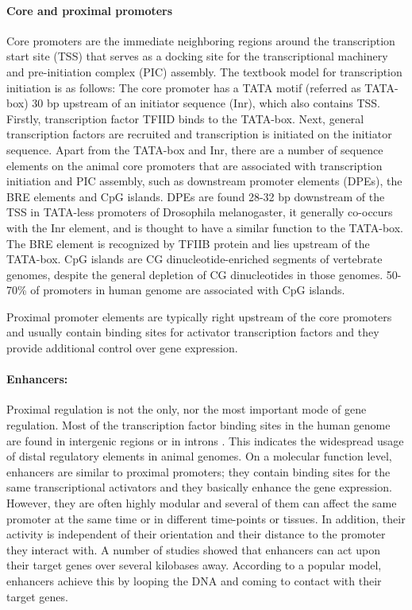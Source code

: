 \documentclass[12pt,]{krantz}
\let\oldparagraph\paragraph
\renewcommand{\paragraph}[1]{\oldparagraph{#1}\mbox{}}
\begin{document}
\hypertarget{core-and-proximal-promoters}{%
\paragraph{Core and proximal promoters}\label{core-and-proximal-promoters}}

Core promoters are the immediate neighboring regions around
the transcription start site (TSS) that serves as a docking site for the
transcriptional machinery and pre-initiation complex (PIC) assembly. The
textbook model for transcription initiation is as follows: The core promoter has
a TATA motif (referred as TATA-box) 30 bp upstream of an initiator sequence
(Inr), which also contains TSS. Firstly, transcription factor TFIID binds to the
TATA-box. Next, general transcription factors are recruited and transcription is
initiated on the initiator sequence. Apart from the
TATA-box and Inr, there are a number of sequence elements on the animal core
promoters that are associated with transcription initiation and PIC assembly,
such as downstream promoter elements (DPEs), the BRE elements and CpG islands.
DPEs are found 28-32 bp downstream of the TSS in TATA-less promoters of
Drosophila melanogaster, it generally co-occurs with the Inr element, and is
thought to have a similar function to the TATA-box. The BRE element is
recognized by TFIIB protein and lies upstream of the TATA-box. CpG islands
are CG dinucleotide-enriched segments of vertebrate genomes, despite the general
depletion of CG dinucleotides in those genomes. 50-70\% of promoters in
human genome are associated with CpG islands.

Proximal promoter elements are typically right upstream
of the core promoters and usually contain binding sites for activator
transcription factors and they
provide additional control over gene expression.

\hypertarget{enhancers}{%
\paragraph{Enhancers:}\label{enhancers}}

Proximal regulation is not the only, nor the most important mode
of gene regulation. Most of the transcription factor binding sites in
the human genome are found in intergenic regions or in introns .
This indicates the widespread usage of distal regulatory elements in animal
genomes. On a molecular
function level, enhancers are similar to proximal promoters; they contain binding
sites for the same transcriptional activators and they basically enhance the
gene expression. However, they are often highly modular and several of them
can affect the same promoter at the same time or in different time-points or
tissues. In addition, their activity is independent of their
orientation and their distance to the promoter they interact with. A
number of studies showed that enhancers can act upon their target genes over
several kilobases away. According to a popular
model, enhancers achieve this by looping the DNA and coming to contact with
their target genes.
\end{document}
